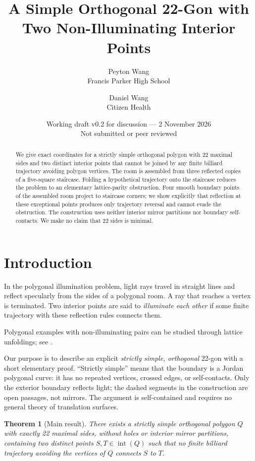 \documentclass[11pt]{article}
\title{A Simple Orthogonal 22-Gon with\\Two Non-Illuminating Interior Points}
\author{Peyton Wang\\\small Francis Parker High School \and Daniel Wang\\\small Citizen Health}
\date{Working draft v0.2 for discussion --- 2 November 2026\\\small Not submitted or peer reviewed}
\newtheorem{theorem}{Theorem}
\theoremstyle{remark}
\newcommand{\interior}{\operatorname{int}}
\begin{document}
\maketitle
\vspace{-1.2em}
\begin{abstract}
We give exact coordinates for a strictly simple orthogonal polygon with 22 maximal sides and two distinct interior points that cannot be joined by any finite billiard trajectory avoiding polygon vertices. The room is assembled from three reflected copies of a five-square staircase. Folding a hypothetical trajectory onto the staircase reduces the problem to an elementary lattice-parity obstruction. Four smooth boundary points of the assembled room project to staircase corners; we show explicitly that reflection at these exceptional points produces only trajectory reversal and cannot evade the obstruction. The construction uses neither interior mirror partitions nor boundary self-contacts. We make no claim that 22 sides is minimal.
\end{abstract}

\section{Introduction}
In the polygonal illumination problem, light rays travel in straight lines and reflect specularly from the sides of a polygonal room. A ray that reaches a vertex is terminated. Two interior points are said to \emph{illuminate each other} if some finite trajectory with these reflection rules connects them.

Polygonal examples with non-illuminating pairs can be studied through lattice unfoldings; see \cite{Tokarsky1995,Wolecki2024}.

Our purpose is to describe an explicit \emph{strictly simple, orthogonal} 22-gon with a short elementary proof. ``Strictly simple'' means that the boundary is a Jordan polygonal curve: it has no repeated vertices, crossed edges, or self-contacts. Only the exterior boundary reflects light; the dashed segments in the construction are open passages, not mirrors. The argument is self-contained and requires no general theory of translation surfaces.

\begin{theorem}[Main result]\label{thm:main}
There exists a strictly simple orthogonal polygon $Q$ with exactly 22 maximal sides, without holes or interior mirror partitions, containing two distinct points $S,T\in\interior(Q)$ such that no finite billiard trajectory avoiding the vertices of $Q$ connects $S$ to $T$.
\end{theorem}
\end{document}
